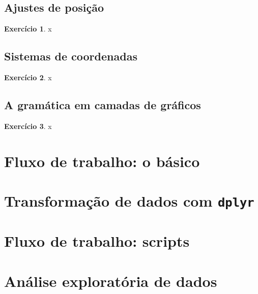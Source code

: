 \documentclass[
]{book}
\theoremstyle{definition}
\theoremstyle{definition}
\theoremstyle{definition}
\newtheorem{exercise}{Exercício}[chapter]
\theoremstyle{definition}
\theoremstyle{remark}
\begin{document}
\hypertarget{ajustes-de-posiuxe7uxe3o}{%
\section{Ajustes de posição}\label{ajustes-de-posiuxe7uxe3o}}

\begin{exercise}
x
\end{exercise}

\hypertarget{sistemas-de-coordenadas}{%
\section{Sistemas de coordenadas}\label{sistemas-de-coordenadas}}

\begin{exercise}
x
\end{exercise}

\hypertarget{a-gramuxe1tica-em-camadas-de-gruxe1ficos}{%
\section{A gramática em camadas de gráficos}\label{a-gramuxe1tica-em-camadas-de-gruxe1ficos}}

\begin{exercise}
x
\end{exercise}

\hypertarget{fluxo-de-trabalho-o-buxe1sico}{%
\chapter{Fluxo de trabalho: o básico}\label{fluxo-de-trabalho-o-buxe1sico}}

\hypertarget{transformauxe7uxe3o-de-dados-com-dplyr}{%
\chapter{\texorpdfstring{Transformação de dados com \texttt{dplyr}}{Transformação de dados com dplyr}}\label{transformauxe7uxe3o-de-dados-com-dplyr}}

\hypertarget{fluxo-de-trabalho-scripts}{%
\chapter{Fluxo de trabalho: scripts}\label{fluxo-de-trabalho-scripts}}

\hypertarget{anuxe1lise-exploratuxf3ria-de-dados}{%
\chapter{Análise exploratória de dados}\label{anuxe1lise-exploratuxf3ria-de-dados}}
\end{document}
